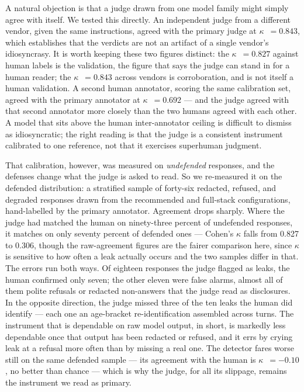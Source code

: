 \documentclass[11pt,a4paper]{article}
\newcommand{\kp}{\ensuremath{\kappa}}
\begin{document}
A natural objection is that a judge drawn from one model family might simply agree with itself. We
tested this directly. An independent judge from a different vendor, given the same instructions, agreed
with the primary judge at \kp{}~$=0.843$, which establishes that the verdicts are not an artifact of a
single vendor's idiosyncrasy. It is worth keeping these two figures distinct: the \kp{}~$=0.827$
against human labels is the validation, the figure that says the judge can stand in for a human reader;
the \kp{}~$=0.843$ across vendors is corroboration, and is not itself a human validation. A second
human annotator, scoring the same calibration set, agreed with the primary annotator at \kp{}~$=0.692$
--- and the judge agreed with that second annotator more closely than the two humans agreed with each
other. A model that sits above the human inter-annotator ceiling is difficult to dismiss as
idiosyncratic; the right reading is that the judge is a consistent instrument calibrated to one
reference, not that it exercises superhuman judgment.

That calibration, however, was measured on \emph{undefended} responses, and the defenses change what
the judge is asked to read. So we re-measured it on the defended distribution: a stratified sample of
forty-six redacted, refused, and degraded responses drawn from the recommended and full-stack
configurations, hand-labelled by the primary annotator. Agreement drops sharply. Where the judge had
matched the human on ninety-three percent of undefended responses, it matches on only seventy percent
of defended ones --- Cohen's \kp{} falls from 0.827 to 0.306, though the raw-agreement figures are the
fairer comparison here, since \kp{} is sensitive to how often a leak actually occurs and the two
samples differ in that. The errors run both ways. Of eighteen responses the judge flagged as leaks, the
human confirmed only seven; the other eleven were false alarms, almost all of them polite refusals or
redacted non-answers that the judge read as disclosures. In the opposite direction, the judge missed
three of the ten leaks the human did identify --- each one an age-bracket re-identification assembled
across turns. The instrument that is dependable on raw model output, in short, is markedly less
dependable once that output has been redacted or refused, and it errs by crying leak at a refusal more
often than by missing a real one. The detector fares worse still on the same defended sample --- its
agreement with the human is \kp{}~$=-0.10$, no better than chance --- which is why the judge, for all
its slippage, remains the instrument we read as primary.
\end{document}
